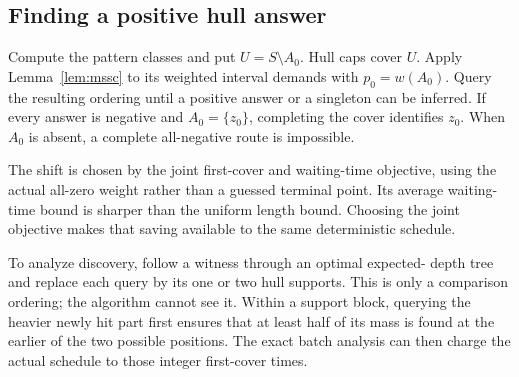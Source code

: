\subsection{Finding a positive hull answer}

Compute the pattern classes and put $U=S\setminus A_0$.
Hull caps cover $U$. Apply Lemma~\ref{lem:mssc} to its weighted
interval demands with $p_0=w(A_0)$. Query the resulting ordering
until a positive answer or a singleton can be inferred.
If every answer is negative and
$A_0=\{z_0\}$, completing the cover identifies $z_0$.
When $A_0$ is absent, a complete all-negative route is impossible.

The shift is chosen by the joint first-cover and waiting-time
objective, using the actual all-zero weight rather than a guessed
terminal point. Its average waiting-time bound is sharper than
the uniform length bound. Choosing the joint objective makes that
saving available to the same deterministic schedule.

To analyze discovery, follow a witness through an optimal expected-
depth tree and replace each query by its one or two hull supports.
This is only a comparison ordering; the algorithm cannot see it.
Within a support block, querying the heavier newly hit part first
ensures that at least half of its mass is found at the earlier of
the two possible positions. The exact batch analysis can then charge
the actual schedule to those integer first-cover times.

